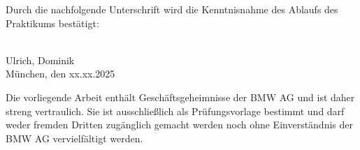 \thispagestyle{empty}

\vspace{1cm}
Durch die nachfolgende Unterschrift wird die Kenntnisnahme des Ablaufs des Praktikums bestätigt:\\

\vspace{2cm}

\makebox[0.5\textwidth]{\dotfill} \\
Ulrich, Dominik \\
München, den xx.xx.2025 

\vspace{3cm}

\vspace{1cm}

Die vorliegende Arbeit enthält Geschäftsgeheimnisse der BMW AG und ist daher streng vertraulich. Sie ist ausschließlich als Prüfungsvorlage bestimmt und darf weder fremden Dritten zugänglich gemacht werden noch ohne Einverständnis der BMW AG vervielfältigt werden.